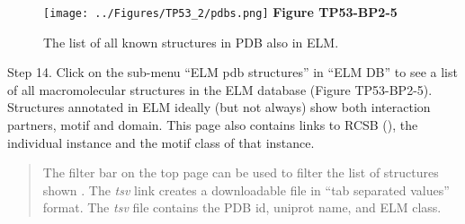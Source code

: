 \begin{figure}[h!]
\centering
\texttt{[image: ../Figures/TP53\_2/pdbs.png]} \textbf{Figure TP53-BP2-5}
\caption{
The list of all known structures in PDB also in ELM.
}
\end{figure}

Step 14. Click on the sub-menu ``ELM pdb structures'' in ``ELM DB'' to
see a list of all macromolecular structures in the ELM database (Figure
TP53-BP2-5). Structures annotated in ELM ideally (but not always) show
both interaction partners, motif and domain. This page also contains
links to RCSB (\cite{12037327}), the individual instance and the motif
class of that instance.

\begin{quote}
The filter bar on the top page can be used to filter the list of
structures shown . The \emph{tsv} link creates a downloadable file in
``tab separated values'' format. The \emph{tsv} file contains the PDB
id, uniprot name, and ELM class.
\end{quote}

